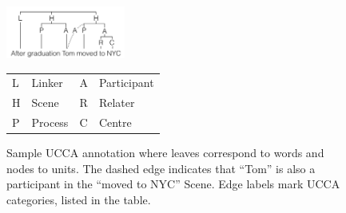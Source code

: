 \documentclass[11pt,letterpaper]{article}
\begin{document}
%


\begin{figure}
    \begin{center}
    \includegraphics[width=0.35\textwidth]{ucca-tree-v2.png}

{\small
\begin{tabular}{|l|l|l|l|}
\hline
L & Linker &  A & Participant \\
H & Scene & R & Relater \\
P & Process & C & Centre \\
\hline
\end{tabular}
}
    \end{center}
\caption{\label{fig:ucca_example_v2}
  Sample UCCA annotation where leaves correspond to words and nodes to units.
  The dashed edge indicates that ``Tom'' is also a participant in the ``moved to NYC''
  Scene. Edge labels mark UCCA categories, listed  in the table.}
\end{figure}
\end{document}
